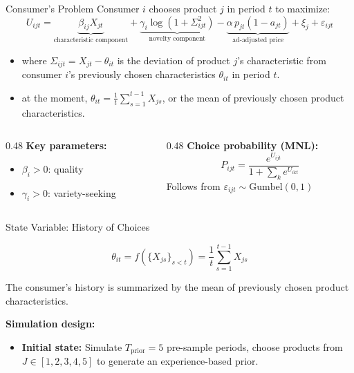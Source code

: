 \documentclass[aspectratio=169,professionalfonts]{beamer}
\newcommand{\hl}[1]{\textbf{\textcolor{UGARed}{#1}}}
\begin{document}
\begin{frame}{Consumer's Problem}
  Consumer $i$ chooses product $j$ in period $t$ to maximize:
  \begin{equation*}
    U_{ijt} = \underbrace{\beta_{ij} X_{jt}}_{\text{characteristic component}}
              + \underbrace{\gamma_i \log(1 + \Sigma_{ijt}^2)}_{\text{novelty component}}
              - \underbrace{\alpha \, p_{jt} (1-a_{jt})}_{\text{ad-adjusted price}}
              + \xi_{j} + \varepsilon_{ijt}
  \end{equation*}
  \begin{itemize}
    \item where $\Sigma_{ijt} = X_{jt} - \theta_{it}$ is the deviation of product $j$'s characteristic from consumer $i$'s previously chosen characteristics $\theta_{it}$ in period $t$.
    \item at the moment, $\theta_{it} = \frac{1}{t}\sum_{s=1}^{t-1} X_{js}$, or the mean of previously chosen product characteristics.
  \end{itemize}
  \vspace{8pt}
  \begin{columns}[T]
    \begin{column}{0.48\textwidth}
      \hl{Key parameters:}
      \begin{itemize}
        \item $\beta_i > 0$: quality
        \item $\gamma_i > 0$: variety-seeking
      \end{itemize}
    \end{column}
    \begin{column}{0.48\textwidth}
      \hl{Choice probability (MNL):}
      \begin{equation*}
        P_{ijt} = \frac{e^{U_{ijt}}}{1 + \sum_{k} e^{U_{ikt}}}
      \end{equation*}
      Follows from $\varepsilon_{ijt} \sim \text{Gumbel}(0,1)$
    \end{column}
  \end{columns}
\end{frame}

\begin{frame}{State Variable: History of Choices}
  \begin{tcolorbox}[colback=red!5!white, colframe=UGARed, title=\textbf{History of Choices $\theta_{it}$}]
    \[
    \theta_{it} = f(\{X_{js}\}_{s < t}) = \frac{1}{t}\sum_{s=1}^{t-1} X_{js}
    \]

    The consumer's history is summarized by the mean of previously chosen product characteristics.
  \end{tcolorbox}

  \vspace{6pt}
  \hl{Simulation design:}
  \begin{itemize}
    \item \textbf{Initial state:} Simulate $T_{\text{prior}} = 5$ pre-sample
          periods, choose products from $J \in [1,2,3,4,5]$ to generate an experience-based
          prior.
  \end{itemize}
\end{frame}
\end{document}
